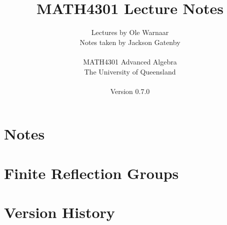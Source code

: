 \documentclass[a4paper]{report}
\title{MATH4301 Lecture Notes}
\author{Lectures by Ole Warnaar\\
Notes taken by Jackson Gatenby\\
\\
MATH4301 Advanced Algebra\\
The University of Queensland\\
\\
Version 0.7.0}
\begin{document}
\maketitle
\tableofcontents



\chapter{Notes}







\chapter{Finite Reflection Groups}




\appendix

\chapter{Version History}

\end{document}
